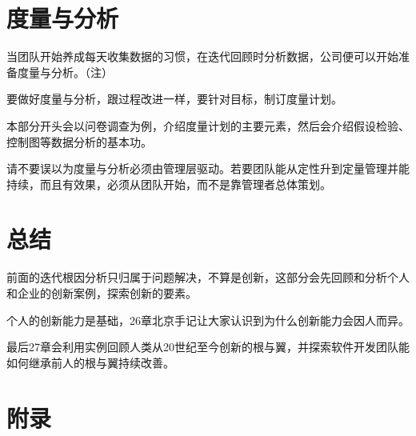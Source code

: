 \documentclass{book}        %
\begin{document}













\part{度量与分析}当团队开始养成每天收集数据的习惯，在迭代回顾时分析数据，公司便可以开始准备度量与分析。（注）

要做好度量与分析，跟过程改进一样，要针对目标，制订度量计划。

本部分开头会以问卷调查为例，介绍度量计划的主要元素，然后会介绍假设检验、控制图等数据分析的基本功。

请不要误以为度量与分析必须由管理层驱动。若要团队能从定性升到定量管理并能持续，而且有效果，必须从团队开始，而不是靠管理者总体策划。









\part{总结} 前面的迭代根因分析只归属于问题解决，不算是创新，这部分会先回顾和分析个人和企业的创新案例，探索创新的要素。

个人的创新能力是基础，26章北京手记让大家认识到为什么创新能力会因人而异。

最后27章会利用实例回顾人类从20世纪至今创新的根与翼，并探索软件开发团队能如何继承前人的根与翼持续改善。 







\part{附录}



%
\end{document}
